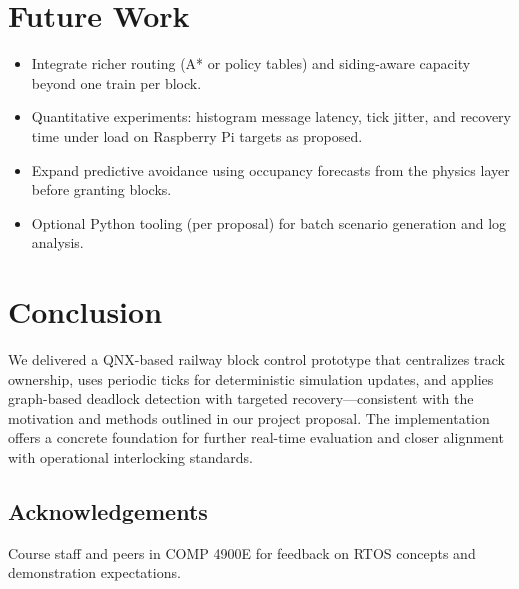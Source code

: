 \documentclass[11pt,a4paper]{article}
\begin{document}
\section{Future Work}

\begin{itemize}[noitemsep]
  \item Integrate richer routing (A* or policy tables) and siding-aware capacity beyond one train per block.
  \item Quantitative experiments: histogram message latency, tick jitter, and recovery time under load on Raspberry Pi targets as proposed.
  \item Expand predictive avoidance using occupancy forecasts from the physics layer before granting blocks.
  \item Optional Python tooling (per proposal) for batch scenario generation and log analysis.
\end{itemize}

\section{Conclusion}

We delivered a QNX-based railway block control prototype that centralizes track ownership, uses periodic ticks for deterministic simulation updates, and applies graph-based deadlock detection with targeted recovery---consistent with the motivation and methods outlined in our project proposal. The implementation offers a concrete foundation for further real-time evaluation and closer alignment with operational interlocking standards.

\subsection*{Acknowledgements}
Course staff and peers in COMP 4900E for feedback on RTOS concepts and demonstration expectations.
\end{document}
